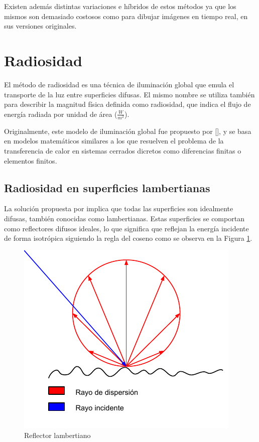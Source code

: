 Existen además distintas variaciones e híbridos de estos métodos ya que los mismos son demasiado costosos como para dibujar imágenes en tiempo real, en sus versiones originales.

\section{Radiosidad}
\label{sec:radiosidad}

El método de radiosidad es una técnica de iluminación global que emula el transporte de la luz entre superficies difusas. El mismo nombre se utiliza también para describir la magnitud física definida como radiosidad, que indica el flujo de energía radiada por unidad de área ($\frac{W}{m^{2}}$).

Originalmente, este modelo de iluminación global fue propuesto por [\citeauthor{Goral}], y se basa en modelos matemáticos similares a los que resuelven el problema de la transferencia de calor en sistemas cerrados dicretos como diferencias finitas o elementos finitos.

\subsection{Radiosidad en superficies lambertianas}

La solución propuesta por \citeauthor{Goral} implica que todas las superficies son idealmente difusas, también conocidas como lambertianas. Estas superficies se comportan como reflectores difusos ideales, lo que significa que reflejan la energía incidente de forma isotrópica siguiendo la regla del coseno como se observa en la Figura \ref{img:lamber}.

\vspace{5mm}
\begin{figure}[h]
	\centering
	\includegraphics[width=.5\linewidth]{assets/lambert}
	\caption{Reflector lambertiano}
	\label{img:lamber}
\end{figure}

